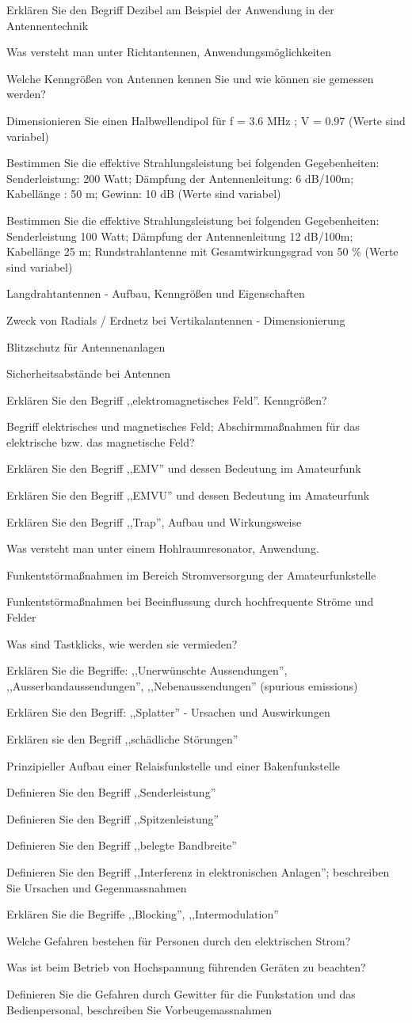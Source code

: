\documentclass[avery5371,grid,frame,a4paper]{flashcards}
\newcommand\question[2]{
  \begin{flashcard}[{\chap} -- #1]{#2}\end{flashcard}
}
\begin{document}
\question{75}{Erklären Sie den Begriff Dezibel am Beispiel der Anwendung in der Antennentechnik}
\question{76}{Was versteht man unter Richtantennen, Anwendungsmöglichkeiten}
\question{77}{Welche Kenngrößen von Antennen kennen Sie und wie können sie gemessen werden?}
\question{78}{Dimensionieren Sie einen Halbwellendipol für f = 3.6 MHz ; V = 0.97 (Werte sind variabel)}
\question{79}{Bestimmen Sie die effektive Strahlungsleistung bei folgenden Gegebenheiten: Senderleistung: 200 Watt; Dämpfung der Antennenleitung: 6 dB/100m; Kabellänge : 50 m; Gewinn: 10 dB (Werte sind variabel)}
\question{80}{Bestimmen Sie die effektive Strahlungsleistung bei folgenden Gegebenheiten: Senderleistung 100 Watt; Dämpfung der Antennenleitung 12 dB/100m; Kabellänge 25 m; Rundstrahlantenne mit Gesamtwirkungsgrad von 50 \% (Werte sind variabel)}
\question{81}{Langdrahtantennen - Aufbau, Kenngrößen und Eigenschaften}
\question{82}{Zweck von Radials / Erdnetz bei Vertikalantennen - Dimensionierung}
\question{83}{Blitzschutz für Antennenanlagen}
\question{84}{Sicherheitsabstände bei Antennen}
\question{85}{Erklären Sie den Begriff ,,elektromagnetisches Feld''. Kenngrößen?}
\question{86}{Begriff elektrisches und magnetisches Feld; Abschirmmaßnahmen für das elektrische bzw. das magnetische Feld?}
\question{87}{Erklären Sie den Begriff ,,EMV'' und dessen Bedeutung im Amateurfunk}
\question{88}{Erklären Sie den Begriff ,,EMVU'' und dessen Bedeutung im Amateurfunk}
\question{89}{Erklären Sie den Begriff ,,Trap'', Aufbau und Wirkungsweise}
\question{90}{Was versteht man unter einem Hohlraumresonator, Anwendung.}
\question{91}{Funkentstörmaßnahmen im Bereich Stromversorgung der Amateurfunkstelle}
\question{92}{Funkentstörmaßnahmen bei Beeinflussung durch hochfrequente Ströme und Felder}
\question{93}{Was sind Tastklicks, wie werden sie vermieden?}
\question{94}{Erklären Sie die Begriffe: ,,Unerwünschte Aussendungen'', ,,Ausserbandaussendungen'', ,,Nebenaussendungen'' (spurious emissions)}
\question{95}{Erklären Sie den Begriff: ,,Splatter'' - Ursachen und Auswirkungen}
\question{96}{Erklären sie den Begriff ,,schädliche Störungen''}
\question{97}{Prinzipieller Aufbau einer Relaisfunkstelle und einer Bakenfunkstelle}
\question{98}{Definieren Sie den Begriff ,,Senderleistung''}
\question{99}{Definieren Sie den Begriff ,,Spitzenleistung''}
\question{100}{Definieren Sie den Begriff ,,belegte Bandbreite''}
\question{101}{Definieren Sie den Begriff ,,Interferenz in elektronischen Anlagen''; beschreiben Sie Ursachen und Gegenmassnahmen}
\question{102}{Erklären Sie die Begriffe ,,Blocking'', ,,Intermodulation''}
\question{103}{Welche Gefahren bestehen für Personen durch den elektrischen Strom?}
\question{104}{Was ist beim Betrieb von Hochspannung führenden Geräten zu beachten?}
\question{105}{Definieren Sie die Gefahren durch Gewitter für die Funkstation und das Bedienpersonal, beschreiben Sie Vorbeugemassnahmen}
\end{document}
